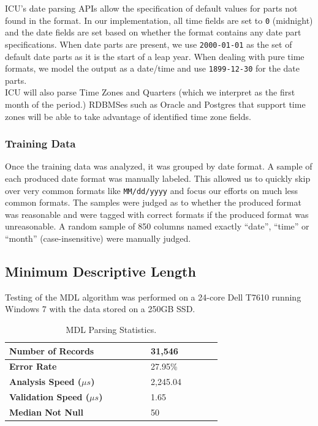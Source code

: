 ICU's date parsing APIs allow the specification of default values for parts not found in the format. In our implementation, all time fields are set to \texttt{0} (midnight) and the date fields are set based on whether the format contains any date part specifications. When date parts are present, we use \texttt{2000-01-01} as the set of default date parts as it is the start of a leap year. When dealing with pure time formats, we model the output as a date/time and use \texttt{1899-12-30} for the date parts.\\

ICU will also parse Time Zones and Quarters (which we interpret as the first month of the period.) RDBMSes such as Oracle and Postgres that support time zones will be able to take advantage of  identified time zone fields.

\subsubsection{Training Data}

Once the training data was analyzed, it was grouped by date format. A sample of each produced date format was manually labeled. This allowed us to quickly skip over very common formats like \texttt{MM/dd/yyyy} and focus our efforts on much less common formats. The samples were judged as to whether the produced format was reasonable and were tagged with correct formats if the produced format was unreasonable. A random sample of 850 columns named exactly ``date'', ``time'' or ``month'' (case-insensitive) were manually judged.

\subsection{Minimum Descriptive Length}
Testing of the MDL algorithm was performed on a 24-core Dell T7610 running Windows 7 with the data stored on a 250GB SSD.

\begin{table}[ht]
\centering
\bgroup
\def\arraystretch{1.5}
\begin{tabular}{|p{0.48\linewidth}| p{0.24\linewidth}|}
\hline
\textbf{Number of Records} & 31,546\\ \hline
\textbf{Error Rate} & 27.95\% \\ \hline
\textbf{Analysis Speed ($\mu s$)} & 2,245.04 \\ \hline
\textbf{Validation Speed ($\mu s$)} & 1.65 \\ \hline
\textbf{Median Not Null} & 50 \\ \hline
\end{tabular}
\egroup
\caption{MDL Parsing Statistics.}
\label{tab:mdlstats}
\end{table}


